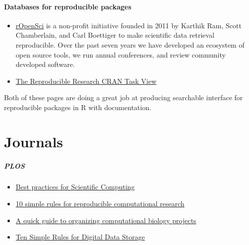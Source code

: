 \documentclass[
]{book}
\theoremstyle{definition}
\theoremstyle{definition}
\theoremstyle{definition}
\theoremstyle{definition}
\theoremstyle{remark}
\begin{document}
\hypertarget{databases-for-reproducible-packages}{%
\subsubsection{Databases for reproducible packages}\label{databases-for-reproducible-packages}}

\begin{itemize}
\item
  \href{https://ropensci.org/about/}{rOpenSci} is a non-profit initiative founded in 2011 by Karthik Ram, Scott Chamberlain, and Carl Boettiger to make scientific data retrieval reproducible. Over the past seven years we have developed an ecosystem of open source tools, we run annual conferences, and review community developed software.
\item
  \href{https://cran.r-project.org/web/views/ReproducibleResearch.html}{The Reproducible Research CRAN Task View}
\end{itemize}

Both of these pages are doing a great job at producing searchable interface for reproducible packages in R with documentation.

\hypertarget{journals}{%
\chapter{Journals}\label{journals}}

\hypertarget{plos}{%
\paragraph{PLOS}\label{plos}}

\begin{itemize}
\item
  \href{http://journals.plos.org/plosbiology/article?id=10.1371/journal.pbio.1001745}{Best practices for Scientific Computing}
\item
  \href{http://journals.plos.org/ploscompbiol/article?id=10.1371/journal.pcbi.1003285}{10 simple rules for reproducible computational research}
\item
  \href{http://journals.plos.org/ploscompbiol/article?id=10.1371/journal.pcbi.1000424}{A quick guide to organizing computational biology projects}
\item
  \href{http://journals.plos.org/ploscompbiol/article?id=10.1371/journal.pcbi.1005097}{Ten Simple Rules for Digital Data Storage}
\end{itemize}
\end{document}
